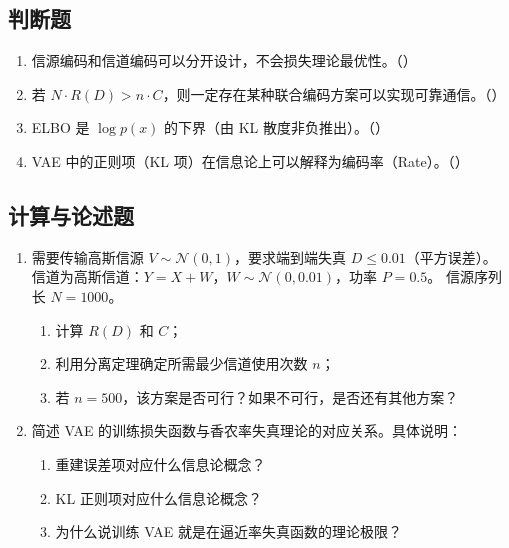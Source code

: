 \documentclass[12pt,a4paper]{ctexart}
\begin{document}
\subsection*{判断题}

\begin{enumerate}[label=\arabic*., leftmargin=*]
\item 信源编码和信道编码可以分开设计，不会损失理论最优性。（\quad）
\item 若 $N \cdot R(D) > n \cdot C$，则一定存在某种联合编码方案可以实现可靠通信。（\quad）
\item ELBO 是 $\log p(x)$ 的下界（由 KL 散度非负推出）。（\quad）
\item VAE 中的正则项（KL 项）在信息论上可以解释为编码率（Rate）。（\quad）
\end{enumerate}

\subsection*{计算与论述题}

\begin{enumerate}[label=\textbf{\arabic*.}, leftmargin=*]
\item 需要传输高斯信源 $V \sim \mathcal{N}(0,1)$，要求端到端失真 $D \leq 0.01$（平方误差）。
信道为高斯信道：$Y = X + W$，$W \sim \mathcal{N}(0, 0.01)$，功率 $P = 0.5$。
信源序列长 $N=1000$。
\begin{enumerate}
  \item 计算 $R(D)$ 和 $C$；
  \item 利用分离定理确定所需最少信道使用次数 $n$；
  \item 若 $n=500$，该方案是否可行？如果不可行，是否还有其他方案？
\end{enumerate}

\item 简述 VAE 的训练损失函数与香农率失真理论的对应关系。具体说明：
\begin{enumerate}
  \item 重建误差项对应什么信息论概念？
  \item KL 正则项对应什么信息论概念？
  \item 为什么说训练 VAE 就是在逼近率失真函数的理论极限？
\end{enumerate}
\end{enumerate}

\newpage

\end{document}
